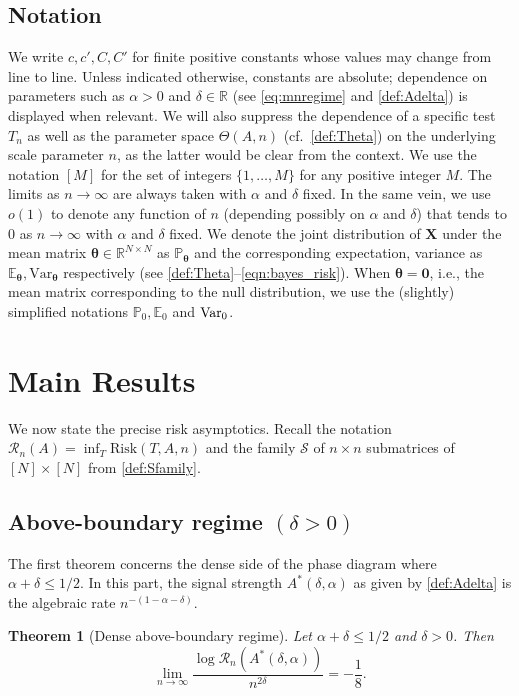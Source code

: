 \documentclass[11pt,reqno,letterpaper]{amsart}
\numberwithin{equation}{section}
\theoremstyle{plain}
\newtheorem{theorem}{Theorem}[section]
\def \btheta{\boldsymbol{\theta}}
\def \bX{\mathbf{X}}
\def \E{\mathbb{E}}
\def \P{\mathbb{P}}
\def \R{\mathbb{R}}
\begin{document}
\subsection{Notation} We write $c,c',C,C'$ for finite positive constants whose 
values may change from line to line. Unless indicated otherwise, constants are 
absolute; dependence on parameters such as $\alpha > 0$ and $\delta \in \R$ (see \eqref{eq:mnregime} and \eqref{def:Adelta}) is displayed when relevant. We will also suppress the dependence of a specific test $T_n$ as well as the parameter space $\Theta(A, n)$ (cf.~\eqref{def:Theta}) on the underlying scale parameter 
$n$, as the latter would be clear from the context. We use the notation $[M]$ for 
the set of integers $\{1,\ldots, M\}$ for any positive integer $M$. The limits as 
$n \to \infty$ are always taken with $\alpha$ and $\delta$ fixed. In the same 
vein, we use $o(1)$ to denote any function of $n$ (depending possibly on $\alpha$ 
and $\delta$) that tends to $0$ as $n \to \infty$ with $\alpha$ and $\delta$ 
fixed. We denote the joint distribution of $\bX$ under the mean matrix $\btheta \in \R^{N \times N}$ as $\P_{\btheta}$ and the corresponding expectation, variance 
as $\E_{\btheta}, \mathrm{Var}_{\btheta}$ respectively (see \eqref{def:Theta}--\eqref{eqn:bayes_risk}). When $\btheta = \mathbf 0$, i.e., the mean matrix 
corresponding to the null distribution, we use the (slightly) simplified notations 
$\P_0, \E_0$ and ${\rm Var}_0$.
 

\section{Main Results} \label{sec:main_results}
We now state the precise risk asymptotics. Recall the notation \sloppy $\mathcal R_n(A)=\inf_T\mathrm{Risk}(T,A,n)$ and the family $\mathcal S$ of $n\times n$ 
submatrices of $[N]\times[N]$ from \eqref{def:Sfamily}.

\subsection{Above-boundary regime $(\delta>0)$}\label{subsec:main_above_bnd}
The first theorem concerns the dense side of the phase diagram where $\alpha + \delta \le 1/2$. In this part, the signal 
strength $A^\ast(\delta, \alpha)$ as given by \eqref{def:Adelta} is the algebraic rate $n^{-(1-\alpha-\delta)}$. %
\begin{theorem}[Dense above-boundary regime]\label{thm:dense_above_boundary}
Let $\alpha + \delta \leq 1/2$ and $\delta>0$. %
Then
\begin{equation}\label{eq:dense_riskbnd1}
\lim_{n\to\infty}
\frac{\log \mathcal R_n(A^\ast(\delta, \alpha))}{n^{2\delta}}
=-\frac18.
\end{equation}
\end{theorem}
\end{document}
